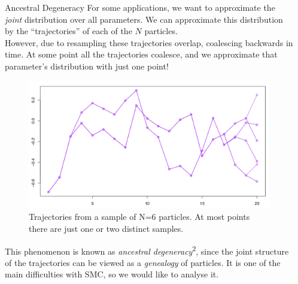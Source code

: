 \documentclass[final, 12pt]{beamer}
\newlength{\colwidth}
\begin{document}
\begin{frame}
\begin{columns}
\begin{column}{\colwidth}
\begin{block}{Ancestral Degeneracy}
For some applications, we want to approximate the \emph{joint} distribution over all parameters.
We can approximate this distribution by the ``trajectories'' of each of the $N$ particles.\\[12pt]

However, due to resampling these trajectories overlap, coalescing backwards in time. At some point all the trajectories coalesce, and we approximate that parameter's distribution with just one point!

\begin{figure} %
\includegraphics[width=0.9\colwidth]{../degeneracy.pdf}
\caption{Trajectories from a sample of N=6 particles. At most points there are just one or two distinct samples.}
\end{figure}

This phenomenon is known as \emph{ancestral degeneracy}\textsuperscript{2}, since the joint structure of the trajectories can be viewed as a \emph{genealogy} of particles. It is one of the main difficulties with SMC, so we would like to analyse it.
\end{block}
\end{column}

\begin{column}{\colwidth}
\vspace*{5pt}


\end{column}
\end{columns}
\end{frame}
\end{document}
